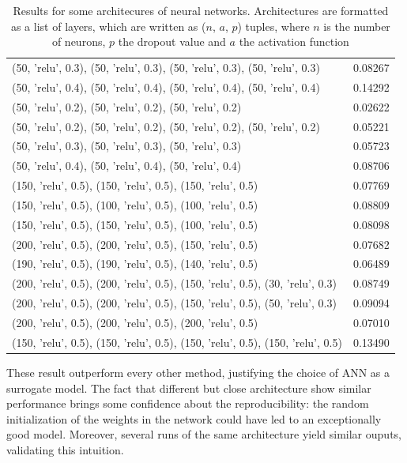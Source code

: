 \begin{table}[h!]
\begin{tabular}{|p{}|p{}|}
        (50, 'relu', 0.3), (50, 'relu', 0.3), (50, 'relu', 0.3), (50, 'relu', 0.3) & 0.08267 \\
        (50, 'relu', 0.4), (50, 'relu', 0.4), (50, 'relu', 0.4), (50, 'relu', 0.4) & 0.14292 \\
        (50, 'relu', 0.2), (50, 'relu', 0.2), (50, 'relu', 0.2) & 0.02622 \\
        (50, 'relu', 0.2), (50, 'relu', 0.2), (50, 'relu', 0.2), (50, 'relu', 0.2) & 0.05221 \\
        (50, 'relu', 0.3), (50, 'relu', 0.3), (50, 'relu', 0.3) & 0.05723 \\
        (50, 'relu', 0.4), (50, 'relu', 0.4), (50, 'relu', 0.4) & 0.08706 \\
        (150, 'relu', 0.5), (150, 'relu', 0.5), (150, 'relu', 0.5) & 0.07769 \\
        (150, 'relu', 0.5), (100, 'relu', 0.5), (100, 'relu', 0.5) & 0.08809 \\
        (150, 'relu', 0.5), (150, 'relu', 0.5), (100, 'relu', 0.5) & 0.08098 \\
        (200, 'relu', 0.5), (200, 'relu', 0.5), (150, 'relu', 0.5) & 0.07682 \\
        (190, 'relu', 0.5), (190, 'relu', 0.5), (140, 'relu', 0.5) & 0.06489 \\
        (200, 'relu', 0.5), (200, 'relu', 0.5), (150, 'relu', 0.5), (30, 'relu', 0.3) & 0.08749 \\
        (200, 'relu', 0.5), (200, 'relu', 0.5), (150, 'relu', 0.5), (50, 'relu', 0.3) & 0.09094 \\
        (200, 'relu', 0.5), (200, 'relu', 0.5), (200, 'relu', 0.5) & 0.07010 \\
        (150, 'relu', 0.5), (150, 'relu', 0.5), (150, 'relu', 0.5), (150, 'relu', 0.5) & 0.13490 \\ \hline
    \end{tabular}
    \caption{Results for some architecures of neural networks. Architectures are formatted as a list of layers, which are written as ($n$, $a$, $p$) tuples, where $n$ is the number of neurons, $p$ the dropout value and $a$ the activation function}
    \label{tab:nn-results}
\end{table}

These result outperform every other method, justifying the choice of ANN as a surrogate model. The fact that different but close architecture show similar performance brings some confidence about the reproducibility: the random initialization of the weights in the network could have led to an exceptionally good model. Moreover, several runs of the same architecture yield similar ouputs, validating this intuition.

